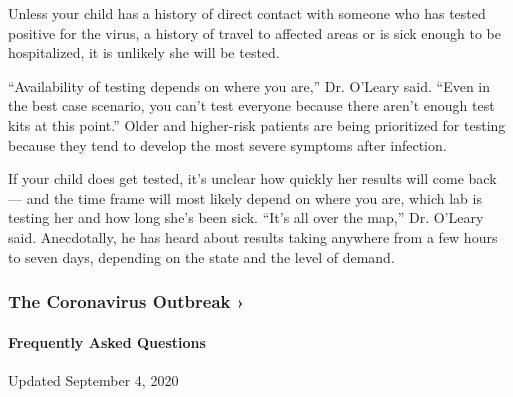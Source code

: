 Unless your child has a history of direct contact with someone who has
tested positive for the virus, a history of travel to affected areas or
is sick enough to be hospitalized, it is unlikely she will be tested.

``Availability of testing depends on where you are,'' Dr. O'Leary said.
``Even in the best case scenario, you can't test everyone because there
aren't enough test kits at this point.'' Older and higher-risk patients
are being prioritized for testing because they tend to develop the most
severe symptoms after infection.

If your child does get tested, it's unclear how quickly her results will
come back --- and the time frame will most likely depend on where you
are, which lab is testing her and how long she's been sick. ``It's all
over the map,'' Dr. O'Leary said. Anecdotally, he has heard about
results taking anywhere from a few hours to seven days, depending on the
state and the level of demand.

\href{https://www.nytimes3xbfgragh.onion/news-event/coronavirus?action=click\&pgtype=Article\&state=default\&region=MAIN_CONTENT_3\&context=storylines_faq}{}

\hypertarget{the-coronavirus-outbreak-}{%
\subsubsection{The Coronavirus Outbreak
›}\label{the-coronavirus-outbreak-}}

\hypertarget{frequently-asked-questions}{%
\paragraph{Frequently Asked
Questions}\label{frequently-asked-questions}}

Updated September 4, 2020

